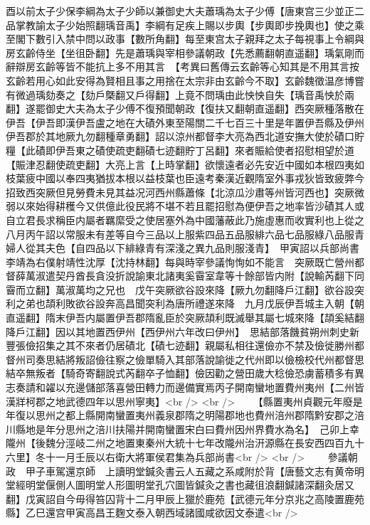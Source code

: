 酉以前太子少保李綱為太子少師以兼御史大夫蕭瑀為太子少傅【唐東宫三少並正二品掌教諭太子少始照翻瑀音禹】李綱有足疾上賜以步輿【步輿即步挽輿也】使之乘至閣下數引入禁中問以政事【數所角翻】每至東宫太子親拜之太子每視事上令綱與房玄齡侍坐【坐徂卧翻】先是蕭瑀與宰相參議朝政【先悉薦翻朝直遥翻】瑀氣剛而辭辯房玄齡等皆不能抗上多不用其言　【考異曰舊傳云玄齡等心知其是不用其言按玄齡若用心如此安得為賢相且事之用捨在太宗非由玄齡今不取】玄齡魏徵温彦博嘗有微過瑀劾奏之【劾戶槩翻又戶得翻】上竟不問瑀由此怏怏自失【瑀音禹怏於兩翻】遂罷御史大夫為太子少傅不復預聞朝政【復扶又翻朝直遥翻】西突厥種落散在伊吾【伊吾即漢伊吾盧之地在大磧外東至陽關二千七百三十里是年置伊吾縣及伊州伊吾郡於其地厥九勿翻種章勇翻】詔以涼州都督李大亮為西北道安撫大使於磧口貯糧【此磧即伊吾東之磧使疏吏翻磧七迹翻貯丁呂翻】來者賑給使者招慰相望於道【賑津忍翻使疏吏翻】大亮上言【上時掌翻】欲懷遠者必先安近中國如本根四夷如枝葉疲中國以奉四夷猶拔本根以益枝葉也臣遠考秦漢近觀隋室外事戎狄皆致疲弊今招致西突厥但見勞費未見其益况河西州縣蕭條【北涼瓜沙肅等州皆河西也】突厥微弱以來始得耕穫今又供億此役民將不堪不若且罷招慰為便伊吾之地率皆沙磧其人或自立君長求稱臣内屬者羈縻受之使居塞外為中國藩蔽此乃施虛惠而收實利也上從之　八月丙午詔以常服未有差等自今三品以上服紫四品五品服緋六品七品服綠八品服青婦人從其夫色【自四品以下緋綠青有深淺之異九品則服淺青】　甲寅詔以兵部尚書李靖為右僕射靖性沈厚【沈持林翻】每與時宰參議恂恂如不能言　突厥既亡營州都督薛萬淑遣契丹酋長貪没折說諭東北諸夷奚霫室韋等十餘部皆内附【說輸芮翻下同霫而立翻】萬淑萬均之兄也　戊午突厥欲谷設來降【厥九勿翻降戶江翻】欲谷設突利之弟也頡利敗欲谷設奔高昌聞突利為唐所禮遂來降　九月戊辰伊吾城主入朝【朝直遥翻】隋末伊吾内屬置伊吾郡隋亂臣於突厥頡利既滅舉其屬七城來降【頡奚結翻降戶江翻】因以其地置西伊州【西伊州六年改曰伊州】　思結部落饑貧朔州刺史新豐張儉招集之其不來者仍居磧北【磧七迹翻】親屬私相往還儉亦不禁及儉徙勝州都督州司奏思結將叛詔儉往察之儉單騎入其部落說諭徙之代州即以儉檢校代州都督思結卒無叛者【騎奇寄翻說式芮翻卒子恤翻】儉因勸之營田歲大稔儉恐虜蓄積多有異志奏請和糴以充邊儲部落喜營田轉力而邊備實焉丙子開南蠻地置費州夷州【二州皆漢牂柯郡之地武德四年以思州寧夷】<br />
<br />
　　【縣置夷州貞觀元年廢是年復以思州之都上縣開南蠻置夷州義泉郡隋之明陽郡地也費州涪州郡隋黔安郡之涪川縣地是年分思州之涪川扶陽并開南蠻置宋白曰費州因州界費水為名】　己卯上幸隴州【後魏分涇岐二州之地置東秦州大統十七年改隴州治汧源縣在長安西四百九十六里】冬十一月壬辰以右衛大將軍侯君集為兵部尚書<br />
<br />
　　參議朝政　甲子車駕還京師　上讀明堂鍼灸書云人五藏之系咸附於背【唐藝文志有黄帝明堂經明堂偃側人圖明堂人形圖明堂孔穴圖皆鍼灸之書也藏徂浪翻鍼諸深翻灸居又翻】戊寅詔自今毋得笞囚背十二月甲辰上獵於鹿苑【武德元年分京兆之高陵置鹿苑縣】乙巳還宫甲寅高昌王麴文泰入朝西域諸國咸欲因文泰遣<br />
